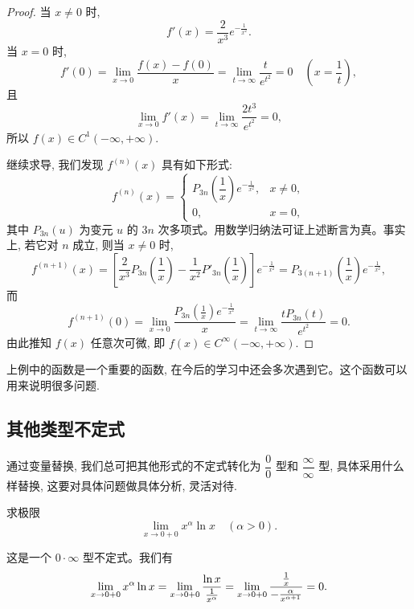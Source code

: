 \begin{proof}
当 $x\ne0$ 时,
\[
  f'(x)=\frac2{x^3}e^{-\frac1{x^2}}.
\]
当 $x=0$ 时,
\[
  f'(0)=\lim_{x\to0}\frac{f(x)-f(0)}x
  =
  \lim_{t\to\infty}\frac{t}{e^{t^2}}
  =
  0\quad \left(x=\frac1t\right),
\]
且
\[
  \lim_{x\to0}f'(x)
  =
  \lim_{t\to\infty}\frac{2t^3}{e^{t^2}}
  =
  0,
\]
所以 $f(x)\in C^1(-\infty,+\infty)$.

继续求导, 我们发现 $f^{(n)}(x)$ 具有如下形式:
\[
  f^{(n)}(x)=
  \begin{cases}
    P_{3n}\left(\dfrac1x\right)e^{-\frac1{x^2}}, & x\ne0,\\
    0, & x=0,
  \end{cases}
\]
其中 $P_{3n}(u)$ 为变元 $u$ 的 $3n$ 次多项式。用数学归纳法可证上述断言为真。事实上, 若它对 $n$ 成立, 则当 $x\ne0$ 时,
\[
  f^{(n+1)}(x)
  =
  \left[
    \frac2{x^3}P_{3n}\left(\frac1x\right)
    -
    \frac1{x^2}P'_{3n}\left(\frac1x\right)
  \right]e^{-\frac1{x^2}}
  =
  P_{3(n+1)}\left(\frac1x\right)e^{-\frac1{x^2}},
\]
而
\[
  f^{(n+1)}(0)
  =
  \lim_{x\to0}
  \frac{P_{3n}\left(\frac1x\right)e^{-\frac1{x^2}}}{x}
  =
  \lim_{t\to\infty}\frac{tP_{3n}(t)}{e^{t^2}}
  =
  0.
\]
由此推知 $f(x)$ 任意次可微, 即 $f(x)\in C^\infty(-\infty,+\infty)$.
\end{proof}


\begin{remark}\label{remark:ma-5-source-55}
上例中的函数是一个重要的函数, 在今后的学习中还会多次遇到它。这个函数可以用来说明很多问题.
\end{remark}


\subsection{其他类型不定式}
\label{subsec:ma-5-2-3}

通过变量替换, 我们总可把其他形式的不定式转化为 $\dfrac00$ 型和 $\dfrac\infty\infty$ 型, 具体采用什么样替换, 这要对具体问题做具体分析, 灵活对待.

\begin{example}\label{example:ma-5-2-7}
求极限
\[
  \lim_{x\to0+0}x^\alpha\ln x\quad(\alpha>0).
\]
\end{example}


\begin{solve}
这是一个 $0\cdot\infty$ 型不定式。我们有
\[
  \lim_{x\to0+0}x^\alpha\ln x
  =
  \lim_{x\to0+0}\frac{\ln x}{\frac1{x^\alpha}}
  =
  \lim_{x\to0+0}\frac{\frac1x}{-\frac{\alpha}{x^{\alpha+1}}}
  =
  0.
\qedhere
\]
\end{solve}



